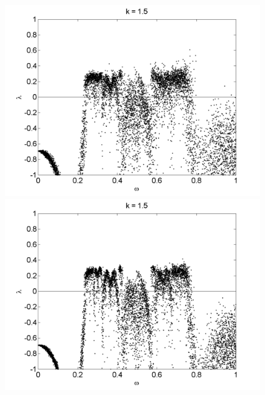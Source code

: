 \begin{figure}[!h]
\includegraphics[width=.5\textwidth]{figs/rcirc_n_lyap_L_05_w.png}\hfill
\includegraphics[width=.5\textwidth]{figs/rcirc_n_lyap_L_09_w.png}\\
\end{figure}


